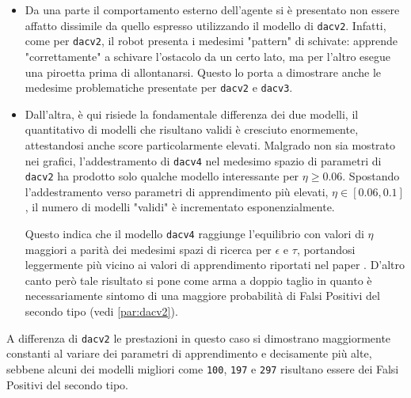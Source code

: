 \begin{itemize}
    \item Da una parte il comportamento esterno dell'agente si è presentato non essere affatto dissimile da quello espresso utilizzando il modello di \texttt{dacv2}. Infatti, come per \texttt{dacv2}, il robot presenta i medesimi "pattern" di schivate: apprende "correttamente" a schivare l'ostacolo da un certo lato, ma per l'altro esegue una piroetta prima di allontanarsi. Questo lo porta a dimostrare anche le medesime problematiche presentate per \texttt{dacv2} e \texttt{dacv3}.
    
    \item Dall'altra, è qui risiede la fondamentale differenza dei due modelli, il quantitativo di modelli che risultano validi è cresciuto enormemente, attestandosi anche score particolarmente elevati. Malgrado non sia mostrato nei grafici, l'addestramento di \texttt{dacv4} nel medesimo spazio di parametri di \texttt{dacv2} ha prodotto solo qualche modello interessante per $\eta \ge 0.06$. Spostando l'addestramento verso parametri di apprendimento più elevati, $\eta \in [0.06, 0.1]$, il numero di modelli "validi" è incrementato esponenzialmente.
    
    Questo indica che il modello \texttt{dacv4} raggiunge l'equilibrio con valori di $\eta$ maggiori a parità dei medesimi spazi di ricerca per $\epsilon$ e $\tau$, portandosi leggermente più vicino ai valori di apprendimento riportati nel paper \cite{verschure1992distributed}. D'altro canto però tale risultato si pone come arma a doppio taglio in quanto è necessariamente sintomo di una maggiore probabilità di Falsi Positivi del secondo tipo (vedi \ref{par:dacv2}).
\end{itemize}

A differenza di \texttt{dacv2} le prestazioni in questo caso si dimostrano maggiormente constanti al variare dei parametri di apprendimento e decisamente più alte, sebbene alcuni dei modelli migliori come \texttt{100}, \texttt{197} e \texttt{297} risultano essere dei Falsi Positivi del secondo tipo.  


